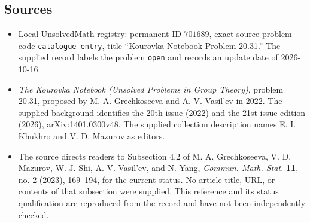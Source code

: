 \documentclass[11pt]{article}
\begin{document}
\subsection{Sources}
\begin{itemize}
\item Local UnsolvedMath registry: permanent ID \(701689\), exact source problem code \texttt{catalogue entry}, title ``Kourovka Notebook Problem 20.31.'' The supplied record labels the problem \texttt{open} and records an update date of 2026-10-16.
\item \emph{The Kourovka Notebook (Unsolved Problems in Group Theory)}, problem 20.31, proposed by M. A. Grechkoseeva and A. V. Vasil'ev in 2022. The supplied background identifies the 20th issue (2022) and the 21st issue edition (2026), arXiv:1401.0300v48. The supplied collection description names E. I. Khukhro and V. D. Mazurov as editors.
\item The source directs readers to Subsection 4.2 of M. A. Grechkoseeva, V. D. Mazurov, W. J. Shi, A. V. Vasil'ev, and N. Yang, \emph{Commun. Math. Stat.} \textbf{11}, no. 2 (2023), 169--194, for the current status. No article title, URL, or contents of that subsection were supplied. This reference and its status qualification are reproduced from the record and have not been independently checked.
\end{itemize}
\end{document}

